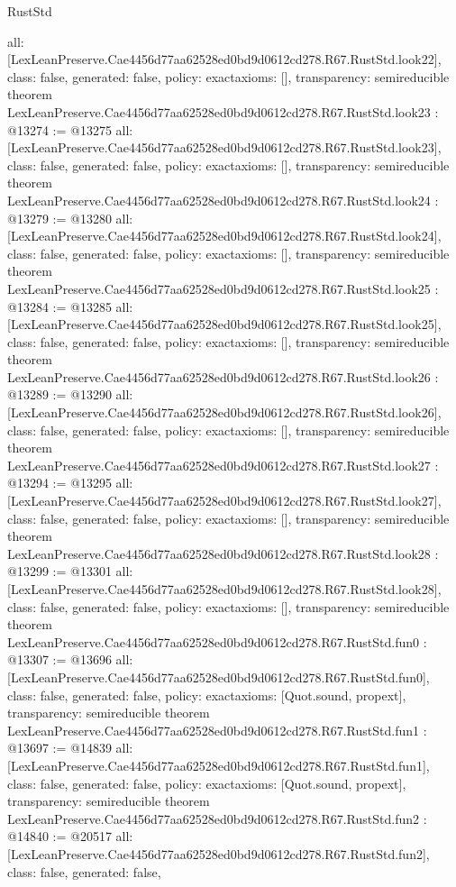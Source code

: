 \begin{lexlean}{RustStd}
\begin{coremodule}
{  all: [LexLeanPreserve.Cae4456d77aa62528ed0bd9d0612cd278.R67.RustStd.look22],
  class: false,
  generated: false,
  policy: exact{axioms: []},
  transparency: semireducible
}
theorem LexLeanPreserve.Cae4456d77aa62528ed0bd9d0612cd278.R67.RustStd.look23 : @13274 := @13275 {
  all: [LexLeanPreserve.Cae4456d77aa62528ed0bd9d0612cd278.R67.RustStd.look23],
  class: false,
  generated: false,
  policy: exact{axioms: []},
  transparency: semireducible
}
theorem LexLeanPreserve.Cae4456d77aa62528ed0bd9d0612cd278.R67.RustStd.look24 : @13279 := @13280 {
  all: [LexLeanPreserve.Cae4456d77aa62528ed0bd9d0612cd278.R67.RustStd.look24],
  class: false,
  generated: false,
  policy: exact{axioms: []},
  transparency: semireducible
}
theorem LexLeanPreserve.Cae4456d77aa62528ed0bd9d0612cd278.R67.RustStd.look25 : @13284 := @13285 {
  all: [LexLeanPreserve.Cae4456d77aa62528ed0bd9d0612cd278.R67.RustStd.look25],
  class: false,
  generated: false,
  policy: exact{axioms: []},
  transparency: semireducible
}
theorem LexLeanPreserve.Cae4456d77aa62528ed0bd9d0612cd278.R67.RustStd.look26 : @13289 := @13290 {
  all: [LexLeanPreserve.Cae4456d77aa62528ed0bd9d0612cd278.R67.RustStd.look26],
  class: false,
  generated: false,
  policy: exact{axioms: []},
  transparency: semireducible
}
theorem LexLeanPreserve.Cae4456d77aa62528ed0bd9d0612cd278.R67.RustStd.look27 : @13294 := @13295 {
  all: [LexLeanPreserve.Cae4456d77aa62528ed0bd9d0612cd278.R67.RustStd.look27],
  class: false,
  generated: false,
  policy: exact{axioms: []},
  transparency: semireducible
}
theorem LexLeanPreserve.Cae4456d77aa62528ed0bd9d0612cd278.R67.RustStd.look28 : @13299 := @13301 {
  all: [LexLeanPreserve.Cae4456d77aa62528ed0bd9d0612cd278.R67.RustStd.look28],
  class: false,
  generated: false,
  policy: exact{axioms: []},
  transparency: semireducible
}
theorem LexLeanPreserve.Cae4456d77aa62528ed0bd9d0612cd278.R67.RustStd.fun0 : @13307 := @13696 {
  all: [LexLeanPreserve.Cae4456d77aa62528ed0bd9d0612cd278.R67.RustStd.fun0],
  class: false,
  generated: false,
  policy: exact{axioms: [Quot.sound, propext]},
  transparency: semireducible
}
theorem LexLeanPreserve.Cae4456d77aa62528ed0bd9d0612cd278.R67.RustStd.fun1 : @13697 := @14839 {
  all: [LexLeanPreserve.Cae4456d77aa62528ed0bd9d0612cd278.R67.RustStd.fun1],
  class: false,
  generated: false,
  policy: exact{axioms: [Quot.sound, propext]},
  transparency: semireducible
}
theorem LexLeanPreserve.Cae4456d77aa62528ed0bd9d0612cd278.R67.RustStd.fun2 : @14840 := @20517 {
  all: [LexLeanPreserve.Cae4456d77aa62528ed0bd9d0612cd278.R67.RustStd.fun2],
  class: false,
  generated: false,
}
\end{coremodule}
\end{lexlean}

